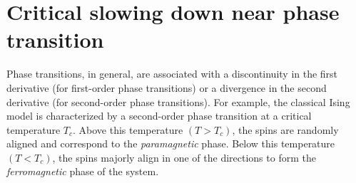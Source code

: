 \documentclass[../journal_main.tex]{subfiles}
\begin{document}
\section{Critical slowing down near phase transition}
Phase transitions, in general, are associated with a discontinuity in the first derivative (for first-order phase transitions) or a divergence in the second derivative (for second-order phase transitions). For example, the classical Ising model is characterized by a second-order phase transition at a critical temperature $T_c$. Above this temperature $(T>T_c)$, the spins are randomly aligned and correspond to the \textit{paramagnetic} phase. Below this temperature $(T<T_c)$, the spins majorly align in one of the directions to form the \textit{ferromagnetic} phase of the system.~\\~\\
\end{document}
